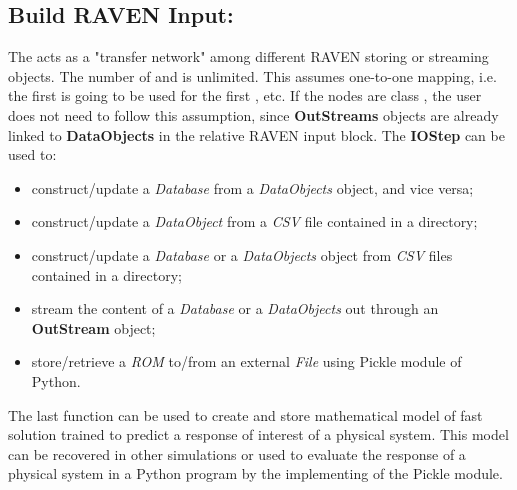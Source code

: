 \subsection{Build RAVEN Input: }
The  acts as a "transfer network" among different RAVEN storing or streaming objects. The number
of  and  is unlimited. This  assumes one-to-one mapping, i.e. the first
 is going to be used for the first , etc. \nb If the  nodes are class
, the user does not need to follow this assumption, since \textbf{OutStreams} objects are already
linked to \textbf{DataObjects} in the relative RAVEN input block.
The \textbf{IOStep} can be used to:
\begin{itemize}
  \item construct/update a \textit{Database} from a \textit{DataObjects} object, and vice versa;
  \item construct/update a \textit{DataObject} from a \textit{CSV} file contained in a directory;
  \item construct/update a \textit{Database} or a \textit{DataObjects} object from
    \textit{CSV} files contained in a directory;
  \item stream the content of a \textit{Database} or a \textit{DataObjects} out through an \textbf{OutStream} object;
  \item store/retrieve a \textit{ROM} to/from an external \textit{File} using Pickle module of Python.
\end{itemize}
The last function can be used to create and store mathematical model of fast solution trained to predict a
response of interest of a physical system. This model can be recovered in other simulations or used to evaluate
the response of a physical system in a Python program by the implementing of the Pickle module.

